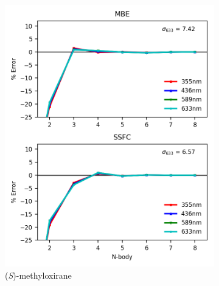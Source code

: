         \begin{figure}
            \begin{subfigure}{0.5\textwidth}
                \centering
                \includegraphics[scale=0.75]{p1/graphs/metox_7_slt_rot.png}
                \caption{(\textit{S})-methyloxirane}
                \label{metox_slt}
            \end{subfigure}%
            \begin{subfigure}{0.5\textwidth}
                \centering

\end{subfigure}
\end{figure}
